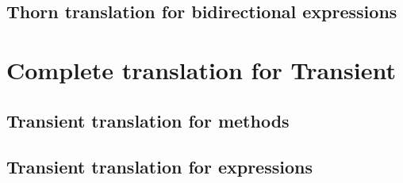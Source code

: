 \documentclass[a4paper,USenglish]{tex/lipics-v2016}
\begin{document}
\subsection{Thorn translation for bidirectional expressions}

\begin{mathpar}




\end{mathpar}

\section{Complete translation for Transient}

\subsection{Transient translation for methods}

\begin{mathpar}

\end{mathpar}

\subsection{Transient translation for expressions}
\end{document}
